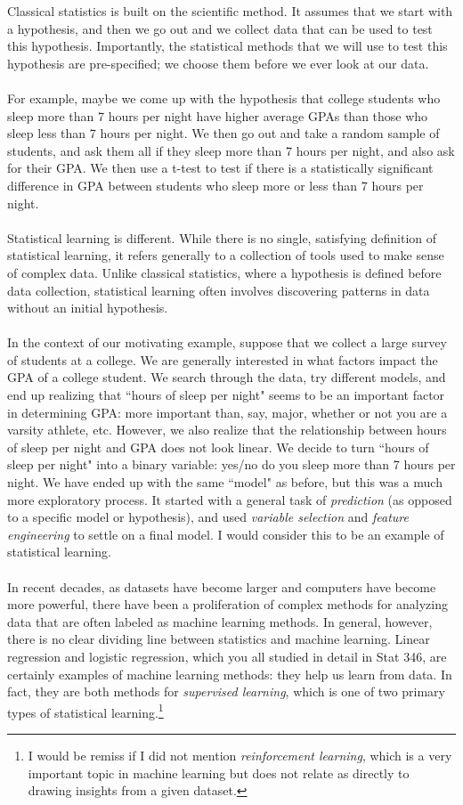 \documentclass[titlepage,10pt]{scrartcl}
\begin{document}
Classical statistics is built on the scientific method. It assumes that we start with a hypothesis, and then we go out and we collect data that can be used to test this hypothesis. Importantly, the statistical methods that we will use to test this hypothesis are pre-specified; we choose them before we ever look at our data. \\
\\
For example, maybe we come up with the hypothesis that college students who sleep more than 7 hours per night have higher average GPAs than those who sleep less than 7 hours per night. We then go out and take a random sample of students, and ask them all if they sleep more than 7 hours per night, and also ask for their GPA. We then use a t-test to test if there is a statistically significant difference in GPA between students who sleep more or less than 7 hours per night. \\
\\
Statistical learning is different. While there is no single, satisfying definition of statistical learning, it refers generally to a collection of tools used to make sense of complex data. Unlike classical statistics, where a hypothesis is defined before data collection, statistical learning often involves discovering patterns in data without an initial hypothesis. \\
\\
In the context of our motivating example, suppose that we collect a large survey of students at a college. We are generally interested in what factors impact the GPA of a college student. We search through the data, try different models, and end up realizing that ``hours of sleep per night" seems to be an important factor in determining GPA: more important than, say, major, whether or not you are a varsity athlete, etc. However, we also realize that the relationship between hours of sleep per night and GPA does not look linear. We decide to turn ``hours of sleep per night" into a binary variable: yes/no do you sleep more than 7 hours per night. We have ended up with the same ``model" as before, but this was a much more exploratory process. It started with a general task of \emph{prediction} (as opposed to a specific model or hypothesis), and used \emph{variable selection} and \emph{feature engineering} to settle on a final model. I would consider this to be an example of statistical learning. \\
\\
In recent decades, as datasets have become larger and computers have become more powerful, there have been a proliferation of complex methods for analyzing data that are often labeled as machine learning methods. In general, however, there is no clear dividing line between statistics and machine learning. Linear regression and logistic regression, which you all studied in detail in Stat 346, are certainly examples of machine learning methods: they help us learn from data. In fact, they are both methods for \emph{supervised learning}, which is one of two primary types of statistical learning.\footnote{I would be remiss if I did not mention \emph{reinforcement learning}, which is a very important topic in machine learning but does not relate as directly to drawing insights from a given dataset.}  
\end{document}
